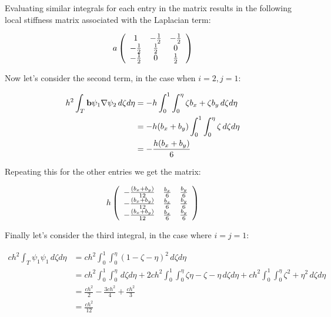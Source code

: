 Evaluating similar integrals for each entry in the matrix results in the
following local stiffness matrix associated with the Laplacian term:

\begin{equation}\label{eq:stiffness_term_1}
    a\left(\begin{array}{c c c}
        1      & -\frac{1}{2} & -\frac{1}{2} \\
        -\frac{1}{2} & \frac{1}{2}  & 0 \\
        -\frac{1}{2} & 0      & \frac{1}{2}
    \end{array}\right)
\end{equation}

Now let's consider the second term, in the case when $i = 2, j = 1$:

\begin{align*}
    h^2\int_T{\mathbf{b}\psi_1\nabla\psi_2}\, d\zeta d\eta &=
    -h\int_0^1\int_0^\eta{\zeta b_x + \zeta b_y}\, d\zeta d\eta \\
    &= -h(b_x + b_y)\int_0^1\int_0^\eta{\zeta}\, d\zeta d\eta \\
    &= -\frac{h(b_x + b_y)}{6}
\end{align*}

Repeating this for the other entries we get the matrix:

\begin{equation}\label{eq:stiffness_term_2}
    h\left(\begin{array}{c c c}
        -\frac{(b_x + b_y)}{12} & \frac{b_x}{6} & \frac{b_y}{6} \\
        -\frac{(b_x + b_y)}{12} & \frac{b_x}{6} & \frac{b_y}{6} \\
        -\frac{(b_x + b_y)}{12} & \frac{b_x}{6} & \frac{b_y}{6}
    \end{array}\right)
\end{equation}

Finally let's consider the third integral, in the case where $i = j = 1$:

\begin{align*}
       ch^2\int_T{\psi_1\psi_1}\,d\zeta d\eta
       &= ch^2\int_0^1\int_0^\eta{(1 - \zeta - \eta)^2}\, d\zeta d\eta \\
%
       &= ch^2\int_0^1\int_0^\eta\, d\zeta d\eta +
          2ch^2\int_0^1\int_0^\eta{\zeta\eta - \zeta - \eta}\, d\zeta d\eta +
          ch^2\int_0^1\int_0^\eta{\zeta^2 + \eta^2}\, d\zeta d\eta \\
%
       &= \frac{ch^2}{2} - \frac{3ch^2}{4} + \frac{ch^2}{3} \\
       &= \frac{ch^2}{12}
\end{align*}


